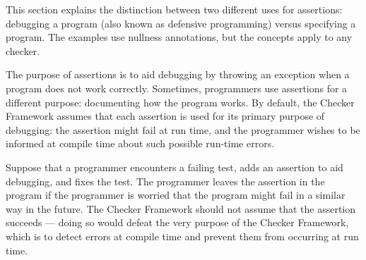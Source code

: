 




This section explains the distinction between two different uses for
assertions:  debugging a program (also known as defensive programming)
versus specifying a program.  The examples use nullness annotations, but
the concepts apply to any checker.

The purpose of assertions is to aid debugging by throwing an exception
when a program does not work correctly.  Sometimes, programmers use assertions for a
different  purpose:  documenting how
the program works.  By default, the Checker Framework assumes that each assertion
is used for its primary purpose of debugging:  the assertion might fail at run time, and the programmer
wishes to be informed at compile time about such possible run-time errors.

Suppose that a
programmer encounters a failing test, adds an assertion to aid debugging, and fixes the
test.  The programmer leaves the assertion in the program if the programmer
is worried that the program might fail in a similar way in the future.
The Checker Framework should not assume that the assertion succeeds ---
doing so would defeat the very purpose of the Checker Framework, which is
to detect errors at compile time and prevent them from occurring at run
time.

